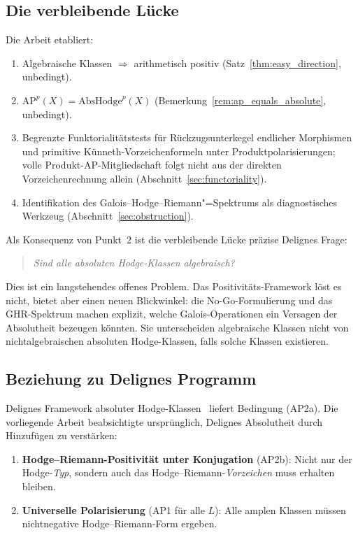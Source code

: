 \documentclass[aps,prd,twocolumn,superscriptaddress,nofootinbib]{revtex4-2}
\theoremstyle{definition}
\theoremstyle{remark}
\begin{document}
\subsection{Die verbleibende Lücke}

Die Arbeit etabliert:
\begin{enumerate}
\item Algebraische Klassen $\Rightarrow$ arithmetisch positiv (Satz~\ref{thm:easy_direction}, unbedingt).
\item $\mathrm{AP}^p(X) = \mathrm{AbsHodge}^p(X)$ (Bemerkung~\ref{rem:ap_equals_absolute}, unbedingt).
\item Begrenzte Funktorialitätstests für Rückzugsunterkegel endlicher Morphismen und primitive Künneth-Vorzeichenformeln unter Produktpolarisierungen; volle Produkt-AP-Mitgliedschaft folgt nicht aus der direkten Vorzeichenrechnung allein (Abschnitt~\ref{sec:functoriality}).
\item Identifikation des Galois--Hodge--Riemann"=Spektrums als diagnostisches Werkzeug (Abschnitt~\ref{sec:obstruction}).
\end{enumerate}

Als Konsequenz von Punkt~2 ist die verbleibende Lücke präzise Delignes Frage:

\begin{quote}
\textit{Sind alle absoluten Hodge-Klassen algebraisch?}
\end{quote}

Dies ist ein langstehendes offenes Problem. Das Positivitäts-Framework löst es nicht, bietet aber einen neuen Blickwinkel: die No-Go-Formulierung und das GHR-Spektrum machen explizit, welche Galois-Operationen ein Versagen der Absolutheit bezeugen könnten. Sie unterscheiden algebraische Klassen nicht von nichtalgebraischen absoluten Hodge-Klassen, falls solche Klassen existieren.

\subsection{Beziehung zu Delignes Programm}

Delignes Framework absoluter Hodge-Klassen~\cite{Deligne1982} liefert Bedingung (AP2a). Die vorliegende Arbeit beabsichtigte ursprünglich, Delignes Absolutheit durch Hinzufügen zu verstärken:

\begin{enumerate}
\item \textbf{Hodge--Riemann-Positivität unter Konjugation} (AP2b): Nicht nur der Hodge-\textit{Typ}, sondern auch das Hodge--Riemann-\textit{Vorzeichen} muss erhalten bleiben.

\item \textbf{Universelle Polarisierung} (AP1 für alle $L$): Alle amplen Klassen müssen nichtnegative Hodge--Riemann-Form ergeben.
\end{enumerate}
\end{document}
